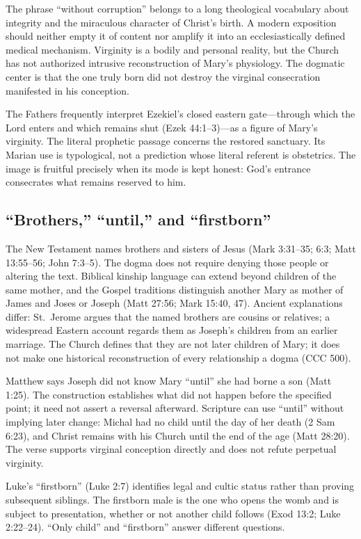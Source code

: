 The phrase ``without corruption'' belongs to a long theological vocabulary about integrity and the miraculous character of Christ's birth. A modern exposition should neither empty it of content nor amplify it into an ecclesiastically defined medical mechanism. Virginity is a bodily and personal reality, but the Church has not authorized intrusive reconstruction of Mary's physiology. The dogmatic center is that the one truly born did not destroy the virginal consecration manifested in his conception.

The Fathers frequently interpret Ezekiel's closed eastern gate---through which the Lord enters and which remains shut (Ezek 44:1--3)---as a figure of Mary's virginity. The literal prophetic passage concerns the restored sanctuary. Its Marian use is typological, not a prediction whose literal referent is obstetrics. The image is fruitful precisely when its mode is kept honest: God's entrance consecrates what remains reserved to him.

\subsection{``Brothers,'' ``until,'' and ``firstborn''}

The New Testament names brothers and sisters of Jesus (Mark 3:31--35; 6:3; Matt 13:55--56; John 7:3--5). The dogma does not require denying those people or altering the text. Biblical kinship language can extend beyond children of the same mother, and the Gospel traditions distinguish another Mary as mother of James and Joses or Joseph (Matt 27:56; Mark 15:40, 47). Ancient explanations differ: St.~Jerome argues that the named brothers are cousins or relatives; a widespread Eastern account regards them as Joseph's children from an earlier marriage. The Church defines that they are not later children of Mary; it does not make one historical reconstruction of every relationship a dogma (CCC 500).

Matthew says Joseph did not know Mary ``until'' she had borne a son (Matt 1:25). The construction establishes what did not happen before the specified point; it need not assert a reversal afterward. Scripture can use ``until'' without implying later change: Michal had no child until the day of her death (2 Sam 6:23), and Christ remains with his Church until the end of the age (Matt 28:20). The verse supports virginal conception directly and does not refute perpetual virginity.

Luke's ``firstborn'' (Luke 2:7) identifies legal and cultic status rather than proving subsequent siblings. The firstborn male is the one who opens the womb and is subject to presentation, whether or not another child follows (Exod 13:2; Luke 2:22--24). ``Only child'' and ``firstborn'' answer different questions.

